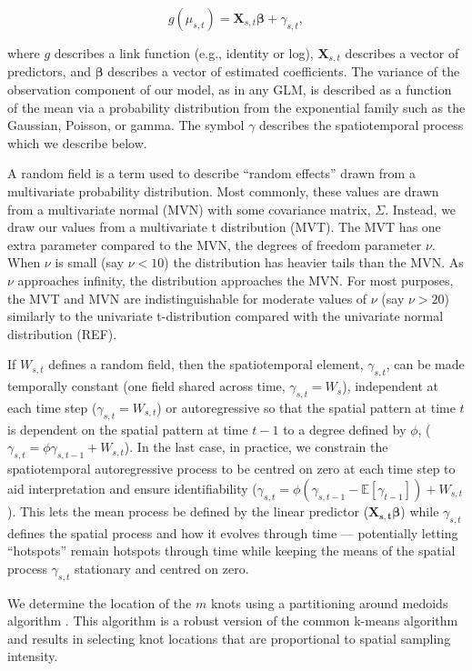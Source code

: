 \documentclass[12pt,english]{article}
\begin{document}
\begin{spacing}{1.25}
\begin{equation}
  g(\mu_{s,t}) = \bm{X}_{s,t} \bm{\beta} + \gamma_{s,t},
\end{equation}

\noindent where $g$ describes a link function (e.g., identity or log),
$\bm{X}_{s,t}$ describes a vector of predictors, and $\bm{\beta}$ describes a
vector of estimated coefficients. The variance of the observation component of
our model, as in any GLM, is described as a function of the mean via a
probability distribution from the exponential family such as the Gaussian,
Poisson, or gamma. The symbol $\gamma$ describes the spatiotemporal process
which we describe below. 

A random field is a term used to describe ``random effects'' drawn from a
multivariate probability distribution. Most commonly, these values are drawn
from a multivariate normal (MVN) with some covariance matrix, $\Sigma$.
Instead, we draw our values from a multivariate t distribution (MVT). The MVT
has one extra parameter compared to the MVN, the degrees of freedom parameter
$\nu$. When $\nu$ is small (say $\nu < 10$) the distribution has heavier
tails than the MVN. As $\nu$ approaches infinity, the distribution approaches
the MVN. For most purposes, the MVT and MVN are indistinguishable for moderate
values of $\nu$ (say $\nu > 20$) similarly to the univariate t-distribution
compared with the univariate normal distribution (REF). 

If $W_{s,t}$ defines a random field, then the spatiotemporal element,
$\gamma_{s,t}$, can be made temporally constant (one field shared across time,
$\gamma_{s,t} = W_{s}$), independent at each time step ($\gamma_{s,t} =
W_{s,t}$) or autoregressive so that the spatial pattern at time $t$ is
dependent on the spatial pattern at time $t-1$ to a degree defined by $\phi$,
($\gamma_{s,t} = \phi \gamma_{s,t-1} + W_{s,t}$). In the last case, in practice,
we constrain the spatiotemporal autoregressive process to be centred on zero at
each time step to aid interpretation and ensure identifiability ($\gamma_{s,t}
= \phi (\gamma_{s,t-1} - \mathbb{E}[\gamma_{t-1}]) + W_{s,t}$). This lets the
mean process be defined by the linear predictor ($\bm{X_{s,t}}\bm{\beta}$)
while $\gamma_{s,t}$ defines the spatial process and how it evolves through
time --- potentially letting ``hotspots'' remain hotspots through time while
keeping the means of the spatial process $\gamma_{s,t}$ stationary and centred
on zero.

We determine the location of the $m$ knots using a partitioning around medoids
algorithm \citep[the \texttt{pam} function in the R package
\textbf{cluster};][]{reynolds2006}. This algorithm is a robust version of the
common k-means algorithm and results in selecting knot locations that are
proportional to spatial sampling intensity. 


\end{spacing}
\end{document}
